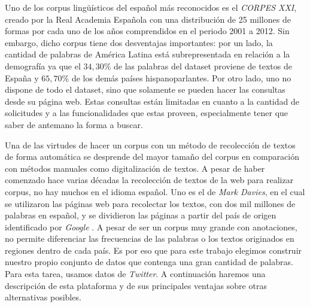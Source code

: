 Uno de los corpus lingüísticos del español más reconocidos es el \emph{CORPES XXI}\cite{espanolabanco}, creado por la Real Academia Española con una distribución de 25 millones de formas por cada uno de los años comprendidos en el periodo 2001 
a 2012. Sin embargo, dicho corpus tiene dos desventajas importantes: por un
lado, la cantidad de palabras de América Latina está subrepresentada en relación a la demografía ya que el $34,30$\% de las palabras del dataset proviene de textos de España y $65,70$\% de los demás países hispanoparlantes. Por otro lado, uno no dispone de todo el dataset, sino que solamente se pueden hacer las consultas desde su página web. Estas consultas están limitadas en cuanto a la cantidad de solicitudes y a las funcionalidades que estas proveen, especialmente tener que saber de antemano la forma a buscar.

Una de las virtudes de hacer un corpus con un método de recolección de textos de forma automática se desprende del mayor tamaño del corpus en comparación con métodos manuales como digitalización de textos. A pesar de haber comenzado hace varias décadas la recolección de textos de la web para realizar corpus, no hay muchos en el idioma español.
Uno es el de \textit{Mark Davies}, en el cual se utilizaron las páginas web para recolectar los textos, con dos mil millones de palabras en español, y se dividieron las páginas a partir del país de origen identificado por \textit{Google} \cite{davies2015}. A pesar de ser un corpus muy grande con anotaciones, no permite diferenciar las frecuencias de las palabras o los textos originados en regiones dentro de cada país. Es por eso que para este trabajo elegimos construir nuestro propio conjunto de datos que contenga una gran cantidad de palabras. Para esta tarea, usamos datos de \textit{Twitter}. A continuación haremos una descripción de esta plataforma y de sus principales ventajas sobre otras alternativas posibles.


